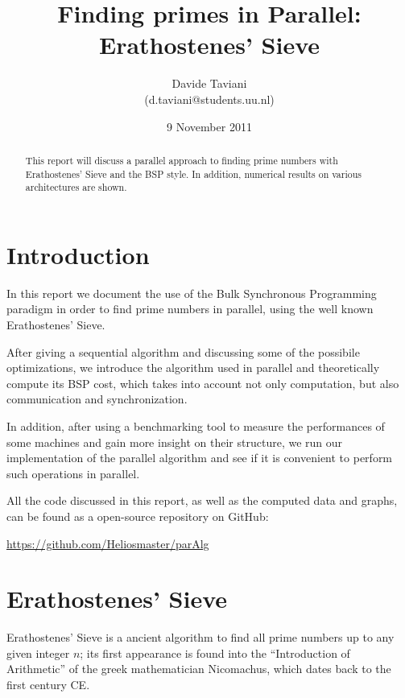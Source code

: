 \documentclass[a4paper,11pt]{article}
\begin{document}
\title{Finding primes in Parallel: Erathostenes' Sieve}
\author{Davide Taviani\\
(d.taviani@students.uu.nl)}
\date{9 November 2011}

\maketitle

\begin{abstract}
This report will discuss a parallel approach to finding prime numbers with Erathostenes' Sieve and the BSP style. In addition, numerical results on various architectures are shown.
\end{abstract}

\tableofcontents

\pagebreak

\section{Introduction}

In this report we document the use of the Bulk Synchronous Programming paradigm \citep{parsc} in order to find prime numbers in parallel, using the well known Erathostenes' Sieve.

After giving a sequential algorithm and discussing some of the possibile optimizations, we introduce the algorithm used in parallel and theoretically compute its BSP cost, which takes into account not only computation, but also communication and synchronization.

In addition, after using a benchmarking tool to measure the performances of some machines and gain more insight on their structure, we run our implementation of the parallel algorithm and see if it is convenient to perform such operations in parallel.

All the code discussed in this report, as well as the computed data and graphs, can be found as a open-source repository on GitHub:

\url{https://github.com/Heliosmaster/parAlg}

\section{Erathostenes' Sieve}

Erathostenes' Sieve is a ancient algorithm to find all prime numbers up to any given integer $n$; its first appearance is found into the  ``Introduction of Arithmetic'' of the greek mathematician Nicomachus, which dates back to the first century CE.
\end{document}
